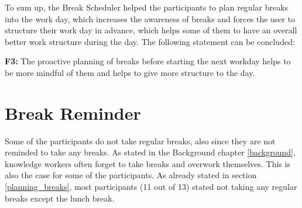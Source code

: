 \documentclass{hasel_thesis}
\begin{document}
To sum up, the Break Scheduler helped the participants to plan regular breaks into the work day, which increases the awareness of breaks and forces the user to structure their work day in advance, which helps some of them to have an overall better work structure during the day. The following statement can be concluded:

\begin{tcolorbox}[colback=white!5!white,colframe=black!75!black]
 \textbf{F3:} The proactive planning of breaks before starting the next workday helps to be more mindful of them and helps to give more structure to the day.
\end{tcolorbox}


\section{Break Reminder} \label{notification}

Some of the participants do not take regular breaks, also since they are not reminded to take any breaks. As stated in the Background chapter \ref{background}, knowledge workers often forget to take breaks and overwork themselves. This is also the case for some of the participants. As already stated in section \ref{planning_breaks}, most participants (11 out of 13) stated not taking any regular breaks except the lunch break.
\end{document}
